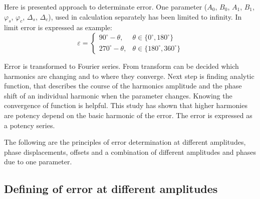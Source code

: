 \documentclass[a4paper]{article}
\begin{document}
Here is presented approach to determinate error. One parameter ($A_0$, $B_0$, $A_1$, $B_1$, $\varphi_{s}$, $\varphi_{c}$, $\Delta_s$, $\Delta_c$), used in calculation separately has been limited to infinity.
In limit error is expressed as example:
\begin{equation}
\label{equ:def_err_inf}
\varepsilon=
\begin{cases}
90^\circ-\theta, & \theta \in \{0^\circ,180^\circ\}\\
270^\circ-\theta, & \theta \in \{180^\circ,360^\circ\}
\end{cases}
\end{equation}

Error is transformed to Fourier series. From transform can be decided which harmonics are changing and to where they converge. Next step is finding analytic function, that describes the course of the harmonics amplitude and the phase shift of an individual harmonic when the parameter changes. Knowing the convergence of function is helpful. This study has shown that higher harmonies are potency depend on the basic harmonic of the error. The error is expressed as a potency series.

The following are the principles of error determination at different amplitudes, phase displacements, offsets and a combination of different amplitudes and phases due to one parameter.

\subsection{Defining of error at different amplitudes}
\end{document}
